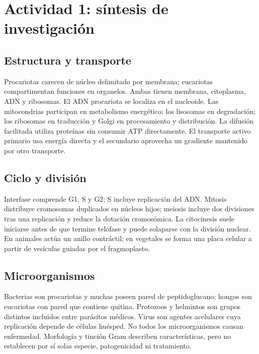 \def\uadectitulo{Biología celular y microbiología}


\portadaUAdeC
\section{Actividad 1: síntesis de investigación}
\subsection{Estructura y transporte}
Procariotas carecen de núcleo delimitado por membrana; eucariotas compartimentan funciones en organelos. Ambas tienen membrana, citoplasma, ADN y ribosomas. El ADN procariota se localiza en el nucleoide. Las mitocondrias participan en metabolismo energético; los lisosomas en degradación; los ribosomas en traducción y Golgi en procesamiento y distribución. La difusión facilitada utiliza proteínas sin consumir ATP directamente. El transporte activo primario usa energía directa y el secundario aprovecha un gradiente mantenido por otro transporte.
\subsection{Ciclo y división}
Interfase comprende G1, S y G2; S incluye replicación del ADN. Mitosis distribuye cromosomas duplicados en núcleos hijos; meiosis incluye dos divisiones tras una replicación y reduce la dotación cromosómica. La citocinesis suele iniciarse antes de que termine telofase y puede solaparse con la división nuclear. En animales actúa un anillo contráctil; en vegetales se forma una placa celular a partir de vesículas guiadas por el fragmoplasto.
\subsection{Microorganismos}
Bacterias son procariotas y muchas poseen pared de peptidoglucano; hongos son eucariotas con pared que contiene quitina. Protozoos y helmintos son grupos distintos incluidos entre parásitos médicos. Virus son agentes acelulares cuya replicación depende de células huésped. No todos los microorganismos causan enfermedad. Morfología y tinción Gram describen características, pero no establecen por sí solas especie, patogenicidad ni tratamiento.
